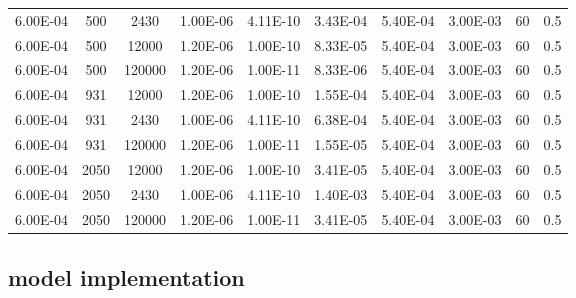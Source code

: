 \documentclass[../thesis.tex]{subfiles}
\begin{document}
\begin{landscape}
\begin{table}[htb]
\begin{tabular}{cccccccccc}
			6.00E-04            & 500         & 2430        & 1.00E-06               & 4.11E-10               & 3.43E-04              & 5.40E-04      & 3.00E-03        & 60                            & 0.5                       \\
			6.00E-04            & 500         & 12000       & 1.20E-06               & 1.00E-10               & 8.33E-05              & 5.40E-04      & 3.00E-03        & 60                            & 0.5                       \\
			6.00E-04            & 500         & 120000      & 1.20E-06               & 1.00E-11               & 8.33E-06              & 5.40E-04      & 3.00E-03        & 60                            & 0.5                       \\
			6.00E-04            & 931         & 12000       & 1.20E-06               & 1.00E-10               & 1.55E-04              & 5.40E-04      & 3.00E-03        & 60                            & 0.5                       \\
			6.00E-04            & 931         & 2430        & 1.00E-06               & 4.11E-10               & 6.38E-04              & 5.40E-04      & 3.00E-03        & 60                            & 0.5                       \\
			6.00E-04            & 931         & 120000      & 1.20E-06               & 1.00E-11               & 1.55E-05              & 5.40E-04      & 3.00E-03        & 60                            & 0.5                       \\
			6.00E-04            & 2050        & 12000       & 1.20E-06               & 1.00E-10               & 3.41E-05              & 5.40E-04      & 3.00E-03        & 60                            & 0.5                       \\
			6.00E-04            & 2050        & 2430        & 1.00E-06               & 4.11E-10               & 1.40E-03              & 5.40E-04      & 3.00E-03        & 60                            & 0.5                       \\
			6.00E-04            & 2050        & 120000      & 1.20E-06               & 1.00E-11               & 3.41E-05              & 5.40E-04      & 3.00E-03        & 60                            & 0.5						\\
			\hline      
		\end{tabular}
	\end{table}
\end{landscape}

\subsection{model implementation}
\end{document}
